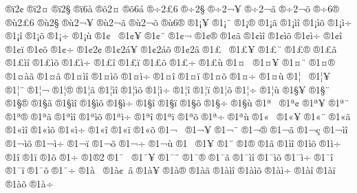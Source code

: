 {^^ae^^ef2^^a2
^^ae^^ef2^^a4
^^ae^^ef2^^a7
^^ae^^ef6^^e0
^^ae^^f52^^a4
^^ae^^f56^^e1
^^ae^^f72^^a36
^^ae^^f72^^a7
^^ae^^f72^^ac^^a5
^^ae^^f72^^ac^^e3
^^ae^^f72^^ac^^f5
^^ae^^f76^^ae
^^ae^^f92^^a36
^^ae^^f92^^a7
^^ae^^f92^^ac^^a5
^^ae^^f92^^ac^^e3
^^ae^^f92^^ac^^f5
^^ae^^f96^^ae
^^ae1^^a1^^a5
^^ae1^^a1^^a8
^^ae1^^a1^^ae
^^ae1^^a1^^e3
^^ae1^^a1^^ec^^ee
^^ae1^^a1^^ec^^f5
^^ae1^^a1^^ec^^f7
^^ae1^^a1^^ee
^^ae1^^a1^^f5
^^ae1^^a1^^f7
^^ae1^^a1^^f9
^^ae1^^a2^^a0
^^ae1^^a2^^a5
^^ae1^^a2^^a8
^^ae1^^a2^^ac
^^ae1^^a2^^ae
^^ae1^^a2^^e3
^^ae1^^a2^^ec^^ee
^^ae1^^a2^^ec^^f5
^^ae1^^a2^^ec^^f7
^^ae1^^a2^^ee
^^ae1^^a2^^ef
^^ae1^^a2^^f5
^^ae1^^a2^^f7
^^ae1^^a22^^a2
^^ae1^^a22^^e1^^a5
^^ae1^^a22^^e1^^f5
^^ae1^^a22^^e2
^^ae1^^a3^^a0
^^ae1^^a3^^a5
^^ae1^^a3^^a8
^^ae1^^a3^^ae
^^ae1^^a3^^e3
^^ae1^^a3^^ec^^ee
^^ae1^^a3^^ec^^f5
^^ae1^^a3^^ec^^f7
^^ae1^^a3^^ee
^^ae1^^a3^^ef
^^ae1^^a3^^f5
^^ae1^^a3^^f7
^^ae1^^a3^^f9
^^ae1^^a4^^a0
^^ae1^^a4^^a5
^^ae1^^a4^^a8
^^ae1^^a4^^ae
^^ae1^^a4^^e0^^e3
^^ae1^^a4^^e3
^^ae1^^a4^^ec^^ee
^^ae1^^a4^^ec^^f5
^^ae1^^a4^^ec^^f7
^^ae1^^a4^^ee
^^ae1^^a4^^ef
^^ae1^^a4^^f5
^^ae1^^a4^^f7
^^ae1^^a4^^f9
^^ae1^^a6^^a0
^^ae1^^a6^^a5
^^ae1^^a6^^a8
^^ae1^^a6^^ac
^^ae1^^a6^^ae
^^ae1^^a6^^e3
^^ae1^^a6^^ec^^ee
^^ae1^^a6^^ec^^f5
^^ae1^^a6^^ec^^f7
^^ae1^^a6^^ee
^^ae1^^a6^^ef
^^ae1^^a6^^f5
^^ae1^^a6^^f7
^^ae1^^a6^^f9
^^ae1^^a7^^a5
^^ae1^^a7^^a8
^^ae1^^a7^^ae
^^ae1^^a7^^e3
^^ae1^^a7^^ec^^ee
^^ae1^^a7^^ec^^f5
^^ae1^^a7^^ec^^f7
^^ae1^^a7^^ee
^^ae1^^a7^^ef
^^ae1^^a7^^f5
^^ae1^^a7^^f7
^^ae1^^a7^^f9
^^ae1^^aa^^a0
^^ae1^^aa^^a2
^^ae1^^aa^^a5
^^ae1^^aa^^a8
^^ae1^^aa^^ae
^^ae1^^aa^^e3
^^ae1^^aa^^ec^^ee
^^ae1^^aa^^ec^^f5
^^ae1^^aa^^ec^^f7
^^ae1^^aa^^ee
^^ae1^^aa^^ef
^^ae1^^aa^^f5
^^ae1^^aa^^f7
^^ae1^^aa^^f9
^^ae1^^ab^^a0
^^ae1^^ab^^a5
^^ae1^^ab^^a8
^^ae1^^ab^^e3
^^ae1^^ab^^ec^^ee
^^ae1^^ab^^ec^^f5
^^ae1^^ab^^ec^^f7
^^ae1^^ab^^ee
^^ae1^^ab^^ef
^^ae1^^ab^^f5
^^ae1^^ac^^a0
^^ae1^^ac^^a5
^^ae1^^ac^^a8
^^ae1^^ac^^ae
^^ae1^^ac^^e3
^^ae1^^ac^^e7
^^ae1^^ac^^ec^^ee
^^ae1^^ac^^ec^^f5
^^ae1^^ac^^ec^^f7
^^ae1^^ac^^ef
^^ae1^^ac^^f5
^^ae1^^ac^^f7
^^ae1^^ac^^f9
^^ae1^^ad^^a0
^^ae1^^ad^^a5
^^ae1^^ad^^a8
^^ae1^^ad^^ae
^^ae1^^ad^^e3
^^ae1^^ad^^ec^^ee
^^ae1^^ad^^ec^^f5
^^ae1^^ad^^ec^^f7
^^ae1^^ad^^ee
^^ae1^^ad^^ef
^^ae1^^ad^^f5
^^ae1^^ad^^f7
^^ae1^^ae2
^^ae1^^af^^a0
^^ae1^^af^^a5
^^ae1^^af^^a8
^^ae1^^af^^ae
^^ae1^^af^^e3
^^ae1^^af^^ec^^ee
^^ae1^^af^^ec^^f5
^^ae1^^af^^ec^^f7
^^ae1^^af^^ee
^^ae1^^af^^ef
^^ae1^^af^^f5
^^ae1^^af^^f7
^^ae1^^e0^^a0
^^ae1^^e0^^a2^^a0^^e2
^^ae1^^e0^^a5
^^ae1^^e0^^ae
^^ae1^^e0^^e3
^^ae1^^e0^^ec^^ee
^^ae1^^e0^^ec^^f5
^^ae1^^e0^^ec^^f7
^^ae1^^e0^^ee
^^ae1^^e0^^ef
^^ae1^^e0^^f5
^^ae1^^e0^^f7
}
